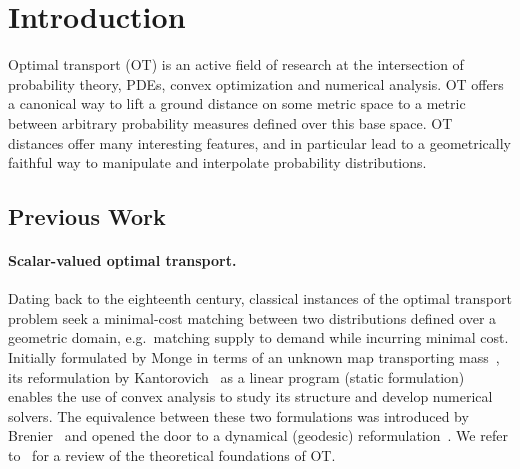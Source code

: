 
\section{Introduction}
\label{sec-intro}


Optimal transport (OT) is an active field of research at the intersection of probability theory, PDEs, convex optimization and numerical analysis. 
%
OT offers a canonical way to lift a ground distance on some metric space to a metric between arbitrary probability measures defined over this base space. OT distances offer many interesting  features, and in particular lead to a geometrically faithful way to manipulate and interpolate probability distributions.




\subsection{Previous Work}

\paragraph{Scalar-valued optimal transport.}

Dating back to the eighteenth century, classical instances of the optimal transport problem seek a minimal-cost matching between two distributions defined over a geometric domain, e.g.\ matching supply to demand while incurring minimal cost. 
Initially formulated by Monge in terms of an unknown map transporting mass~, its reformulation by Kantorovich~ as a linear program (static formulation) enables the use of convex analysis to study its structure and develop numerical solvers. 
% 
The equivalence between these two formulations was introduced by Brenier~ and opened the door to a dynamical (geodesic) reformulation~\cite{benamou2000computational}. We refer to~\cite{santambrogio2015optimal} for a review of the theoretical foundations of OT. 
%

